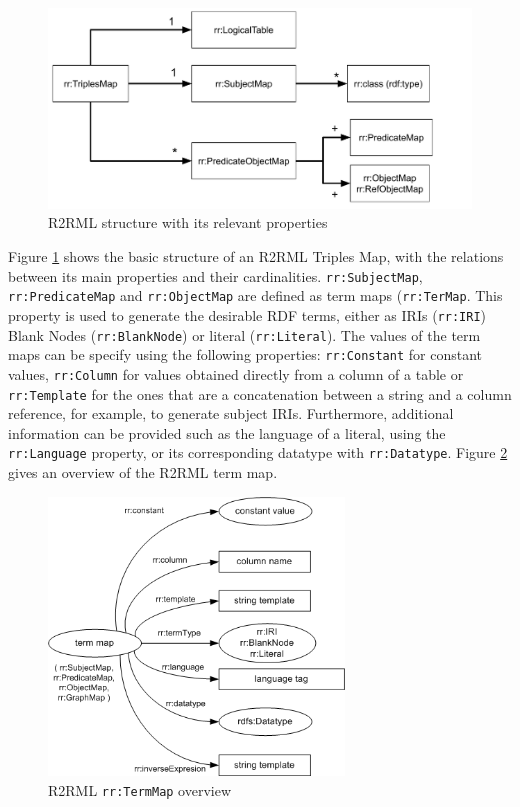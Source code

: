 \begin{figure}[!ht]
\centering
\includegraphics[width=\textwidth]{figures/state-of-the-art/R2RML-structure.pdf}
\caption{R2RML structure with its relevant properties}
\label{fig:soa_r2rml-structure}
\end{figure}

Figure \ref{fig:soa_r2rml-structure} shows the basic structure of an R2RML Triples Map, with the relations between its main properties and their cardinalities. \texttt{rr:SubjectMap}, \texttt{rr:PredicateMap} and \texttt{rr:ObjectMap} are defined as term maps (\texttt{rr:TerMap}. This property is used to generate the desirable RDF terms, either as IRIs (\texttt{rr:IRI}) Blank Nodes (\texttt{rr:BlankNode}) or literal (\texttt{rr:Literal}). The values of the term maps can be specify using the following properties: \texttt{rr:Constant} for constant values, \texttt{rr:Column} for values obtained directly from a column of a table or \texttt{rr:Template} for the ones that are a concatenation between a string and a column reference, for example, to generate subject IRIs. Furthermore, additional information can be provided such as the language of a literal, using the \texttt{rr:Language} property, or its corresponding datatype with \texttt{rr:Datatype}. Figure \ref{fig:soa_termmap-structure} gives an overview of the R2RML term map.


\begin{figure}[!ht]
\centering
\includegraphics[width=0.7\textwidth]{figures/state-of-the-art/term-map.png}
\caption{R2RML \texttt{rr:TermMap} overview}
\label{fig:soa_termmap-structure}
\end{figure}


